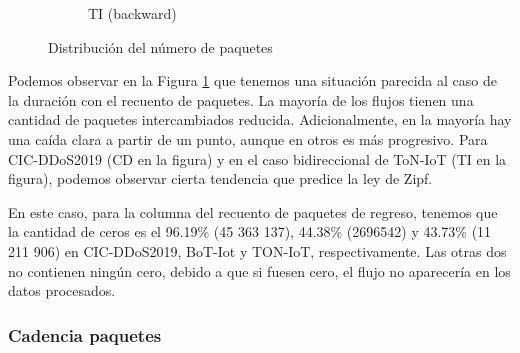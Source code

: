 \begin{figure}[H]
\begin{subfigure}[b]{0.26\textwidth}
        \caption{TI (backward)}
    \end{subfigure}
    \hfill
       \caption{Distribución del número de paquetes}
       \label{fig:packet_pincer_packet_count}
\end{figure}

Podemos observar en la Figura \ref{fig:packet_pincer_packet_count} que tenemos una situación parecida al caso de la duración con el recuento de paquetes. La mayoría de los flujos tienen una cantidad de paquetes intercambiados reducida. Adicionalmente, en la mayoría hay una caída clara a partir de un punto, aunque en otros es más progresivo. Para CIC-DDoS2019 (CD en la figura) y en el caso bidireccional de ToN-IoT (TI en la figura), podemos observar cierta tendencia que predice la ley de Zipf.

En este caso, para la columna del recuento de paquetes de regreso, tenemos que la cantidad de ceros es el 96.19\% (45 363 137), 44.38\% (2696542) y 43.73\% (11 211 906) en CIC-DDoS2019, BoT-Iot y TON-IoT, respectivamente.  Las otras dos no contienen ningún cero, debido a que si fuesen cero, el flujo no aparecería en los datos procesados.

\subsubsection{Cadencia paquetes}

